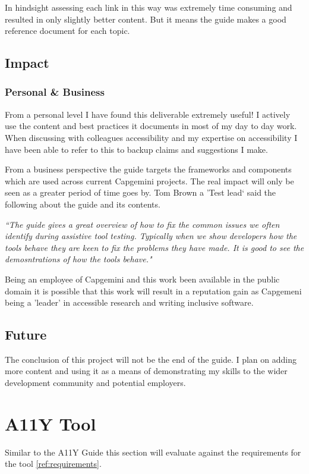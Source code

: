 In hindsight assessing each link in this way was extremely time consuming and
resulted in only slightly better content. But it means the guide makes a good
reference document for each topic.

\subsection{Impact}
\subsubsection{Personal \& Business}
From a personal level I have found this deliverable extremely useful! I
actively use the content and best practices it documents in most of my day to
day work. When discussing with colleagues accessibility and my expertise on
accessibility I have been able to refer to this to backup claims and
suggestions I make.

From a business perspective the guide targets the frameworks and components
which are used across current Capgemini projects. The real impact will
only be seen as a greater period of time goes by. Tom Brown a 'Test lead` said
the following about the guide and its contents.

\begin{center}
\textit{``The guide gives a great overview of how to fix the common issues we
often identify during assistive tool testing. Typically when we show developers
how the tools behave they are keen to fix the problems they have made. It is
good to see the demosntrations of how the tools behave."}
\end{center}

Being an employee of Capgemini and this work been available in the public
domain it is possible that this work will result in a reputation gain as
Capgemeni being a 'leader' in accessible research and writing inclusive
software.

\subsection{Future}
The conclusion of this project will not be the end of the guide. I plan on
adding more content and using it as a means of demonstrating my skills to the
wider development community and potential employers.

\section{A11Y Tool}
Similar to the A11Y Guide this section will evaluate against the requirements
for the tool \ref{ref:requirements}.

